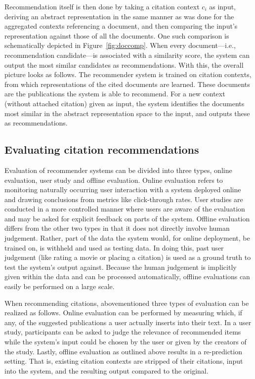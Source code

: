 Recommendation itself is then done by taking a citation context $c_i$ as input, deriving an abstract representation in the same manner as was done for the aggregated contexts referencing a document, and then comparing the input's representation against those of all the documents. One such comparison is schematically depicted in Figure~\ref{fig:doccomp}. When every document---i.e., recommendation candidate---is associated with a similarity score, the system can output the most similar candidates as recommendations. With this, the overall picture looks as follows. The recommender system is trained on citation contexts, from which representations of the cited documents are learned. These documents are the publications the system is able to recommend. For a new context (without attached citation) given as input, the system identifies the documents most similar in the abstract representation space to the input, and outputs these as recommendations.

\subsection{Evaluating citation recommendations}\label{sec:citreceval}
Evaluation of recommender systems can be divided into three types, online evaluation, user study and offline evaluation. Online evaluation refers to monitoring naturally occurring user interaction with a system deployed online and drawing conclusions from metrics like click-through rates. User studies are conducted in a more controlled manner where users are aware of the evaluation and may be asked for explicit feedback on parts of the system. Offline evaluation differs from the other two types in that it does not directly involve human judgement. Rather, part of the data the system would, for online deployment, be trained on, is withheld and used as testing data. In doing this, past user judgement (like rating a movie or placing a citation) is used as a ground truth to test the system's output against. Because the human judgement is implicitly given within the data and can be processed automatically, offline evaluations can easily be performed on a large scale.~\cite{Aggarwal2016}

When recommending citations, abovementioned three types of evaluation can be realized as follows. Online evaluation can be performed by measuring which, if any, of the suggested publications a user actually inserts into their text. In a user study, participants can be asked to judge the relevance of recommended items while the system's input could be chosen by the user or given by the creators of the study. Lastly, offline evaluation as outlined above results in a re-prediction setting. That is, existing citation contexts are stripped of their citations, input into the system, and the resulting output compared to the original.

